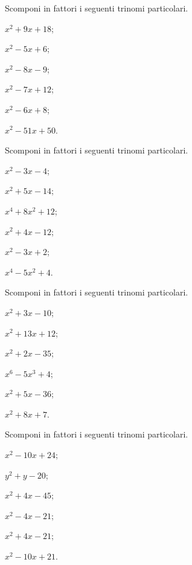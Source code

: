 \begin{esercizio}
 \label{ese:13.58}
 Scomponi in fattori i seguenti trinomi particolari.
 \begin{multicols}{3}
 \begin{enumeratea}
 \item $x^{2}+9x+18$;
 \item $x^{2}-5x+6$;
 \item $x^{2}-8x-9$;
 \item $x^{2}-7x+12$;
 \item $x^{2}-6x+8$;
 \item $x^{2}-51x+50$.
 \end{enumeratea}
\end{multicols}
\end{esercizio}

\begin{esercizio}
 \label{ese:13.59}
 Scomponi in fattori i seguenti trinomi particolari.
 \begin{multicols}{3}
 \begin{enumeratea}
 \item $x^{2}-3x-4$;
 \item $x^{2}+5x-14$;
 \item $x^{4}+8x^{2}+12$;
 \item $x^{2}+4x-12$;
 \item $x^{2}-3x+2$;
 \item $x^{4}-5x^{2}+4$.
 \end{enumeratea}
\end{multicols}
\end{esercizio}

\begin{esercizio}
 \label{ese:13.60}
 Scomponi in fattori i seguenti trinomi particolari.
 \begin{multicols}{3}
 \begin{enumeratea}
 \item $x^{2}+3x-10$;
 \item $x^{2}+13x+12$;
 \item $x^{2}+2x-35$;
 \item $x^{6}-5x^{3}+4$;
 \item $x^{2}+5x-36$;
 \item $x^{2}+8x+7$.
 \end{enumeratea}
\end{multicols}
\end{esercizio}

\begin{esercizio}
 \label{ese:13.61}
 Scomponi in fattori i seguenti trinomi particolari.
 \begin{multicols}{3}
 \begin{enumeratea}
 \item $x^{2}-10x+24$;
 \item $y^{2}+y-20$;
 \item $x^{2}+4x-45$;
 \item $x^{2}-4x-21$;
 \item $x^{2}+4x-21$;
 \item $x^{2}-10x+21$.
 \end{enumeratea}
\end{multicols}
\end{esercizio}


